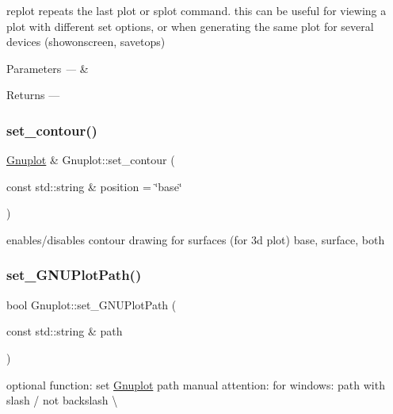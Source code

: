 replot repeats the last plot or splot command. this can be useful for viewing a plot with different set options, or when generating the same plot for several devices (showonscreen, savetops) 


\begin{DoxyParams}{Parameters}
{\em ---} & \\
\hline
\end{DoxyParams}
\begin{DoxyReturn}{Returns}
--- 
\end{DoxyReturn}
\mbox{\label{class_gnuplot_af845efc728a90d7e10de764eff0b2423}} 
\subsubsection{\texorpdfstring{set\+\_\+contour()}{set\_contour()}}
{\footnotesize\ttfamily \mbox{\hyperlink{class_gnuplot}{Gnuplot}} \& Gnuplot\+::set\+\_\+contour (\begin{DoxyParamCaption}\item[{const std\+::string \&}]{position = {\ttfamily \char`\"{}base\char`\"{}} }\end{DoxyParamCaption})}

enables/disables contour drawing for surfaces (for 3d plot) base, surface, both \mbox{\label{class_gnuplot_a67cae885c26ced821e335d98986f1967}} 
\subsubsection{\texorpdfstring{set\+\_\+\+G\+N\+U\+Plot\+Path()}{set\_GNUPlotPath()}}
{\footnotesize\ttfamily bool Gnuplot\+::set\+\_\+\+G\+N\+U\+Plot\+Path (\begin{DoxyParamCaption}\item[{const std\+::string \&}]{path }\end{DoxyParamCaption})\hspace{0.3cm}{\ttfamily [static]}}



optional function\+: set \mbox{\hyperlink{class_gnuplot}{Gnuplot}} path manual attention\+: for windows\+: path with slash \textquotesingle{}/\textquotesingle{} not backslash \textquotesingle{}\textbackslash{}\textquotesingle{} 


